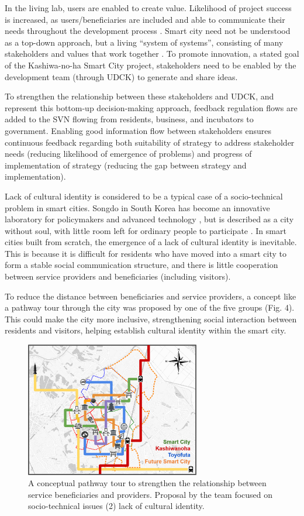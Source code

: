 \documentclass[conference]{IEEEtran}
\begin{document}
In the living lab, users are enabled to create value. Likelihood of project success is increased, as users/beneficiaries are included and able to communicate their needs throughout the development process \cite{pallot2010living}. Smart city need not be understood as a top-down approach, but a living ``system of systems'', consisting of many stakeholders and values that work together \cite{cosgrave2013living}. To promote innovation, a stated goal of the Kashiwa-no-ha Smart City project, stakeholders need to be enabled by the development team (through UDCK) to generate and share ideas.

To strengthen the relationship between these stakeholders and UDCK, and represent this bottom-up decision-making approach, feedback regulation flows are added to the SVN flowing from residents, business, and incubators to government. Enabling good information flow between stakeholders ensures continuous feedback regarding both suitability of strategy to address stakeholder needs (reducing likelihood of emergence of problems) and progress of implementation of strategy (reducing the gap between strategy and implementation).

Lack of cultural identity is considered to be a typical case of a socio-technical problem in smart cities. Songdo in South Korea has become an innovative laboratory for policymakers and advanced technology \cite{carvalho2011urban}, but is described as a city without soul, with little room left for ordinary people to participate \cite{hollands2015critical}. In smart cities built from scratch, the emergence of a lack of cultural identity is inevitable. This is because it is difficult for residents who have moved into a smart city to form a stable social communication structure, and there is little cooperation between service providers and beneficiaries (including visitors).
 
To reduce the distance between beneficiaries and service providers, a concept like a pathway tour through the city was proposed by one of the five groups (Fig. 4). This could make the city more inclusive, strengthening social interaction between residents and visitors, helping establish cultural identity within the smart city.

\begin{figure}[ht!] %
\centering
\includegraphics[width=3in]{PT.png}
\caption{A conceptual pathway tour to strengthen the relationship between service beneficiaries and providers. Proposal by the  team focused on socio-technical issues (2) lack of cultural identity.}
\label{Compare_S}
\end{figure}
\end{document}
